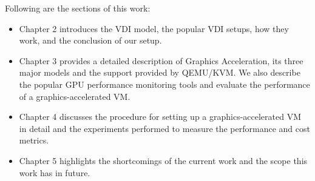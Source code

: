 \documentclass[a4paper,12pt, final]{report}
\begin{document}

\noindent Following are the sections of this work:

\begin{itemize}
    \item Chapter 2 introduces the VDI model, the popular VDI setups, how they work, and the conclusion of our setup.
    \item Chapter 3 provides a detailed description of Graphics Acceleration, its three major models and the support provided by QEMU/KVM. We also describe the popular GPU performance monitoring tools and evaluate the performance of a graphics-accelerated VM.
    \item Chapter 4 discusses the procedure for setting up a graphics-accelerated VM in detail and the experiments performed to measure the performance and cost metrics.
    \item Chapter 5 highlights the shortcomings of the current work and the scope this work has in future.
\end{itemize}

\end{document}
